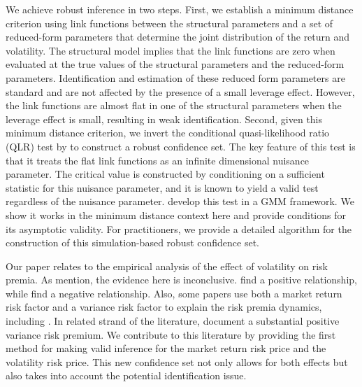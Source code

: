 \documentclass[11pt, letterpaper, twoside]{article}
\begin{document}
We achieve robust inference in two steps. First, we establish a minimum distance criterion using link functions between the structural parameters and a set of reduced-form parameters that determine the joint distribution of the return and volatility. The structural model implies that the link functions are zero when evaluated at the true values of the structural parameters and the reduced-form parameters. Identification and estimation of these reduced form parameters are standard and are not affected by the presence of a small leverage effect. However, the link functions are almost flat in one of the structural parameters when the leverage effect is small, resulting in weak identification. Second, given this minimum distance criterion, we invert the conditional quasi-likelihood ratio (QLR) test by \textcite{andrews2016conditional} to construct a robust confidence set. The key feature of this test is that it treats the flat link functions as an infinite dimensional nuisance parameter. The critical value is constructed by conditioning on a sufficient statistic for this nuisance parameter, and it is known to yield a valid test regardless of the nuisance parameter. \Textcite{andrews2016conditional} develop this test in a GMM framework. We show it works in the minimum distance context here and provide conditions for its asymptotic validity. For practitioners, we provide a detailed algorithm for the construction of this simulation-based robust confidence set.


Our paper relates to the empirical analysis of the effect of volatility on risk premia. As \textcite{lettau2010measuring} mention,  the evidence here is inconclusive. \textcites{bollerslev1988capital, harvey1989timevarying, ghysels2005there, bali2006there, ludvigson2007empirical} find a positive relationship, while \textcites{campbell1987stock, breen1989economic, pagan1991nonparametric, whitelaw1994time, brandt2004relationship} find a negative relationship. Also, some papers use both a market return risk factor and a variance risk factor to explain the risk premia dynamics, including \textcites{christoffersen2013capturing, feunou2014risk, dewbecker2017price}. In related strand of the literature, \textcite{bollerslev2008risk, drechsler2011whats} document a substantial positive variance risk premium. We contribute to this literature by providing the first method for making valid inference for the market return risk price and the volatility risk price. This new confidence set not only allows for both effects but also takes into account the potential identification issue.
\end{document}
